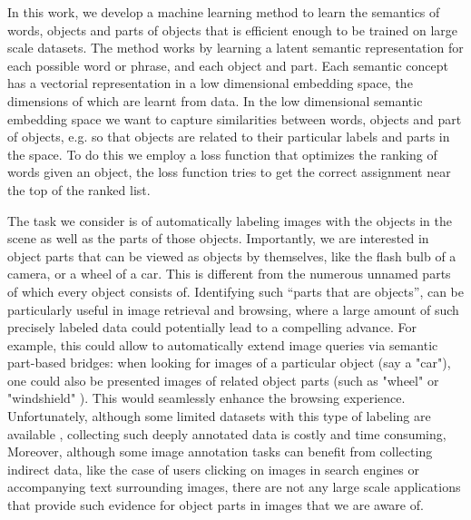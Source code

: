 In this work, we develop a machine learning method to learn the
semantics of words, objects and parts of objects that is efficient
enough to be trained on large scale datasets.  The method works by
learning a latent semantic representation for each possible word or
phrase, and each object and part. Each semantic concept has a
vectorial representation in a low dimensional embedding space, the
dimensions of which are learnt from data.
In the low dimensional semantic embedding space we want to capture
similarities between words, objects and part of objects, e.g. so that
objects are related to their particular labels and parts in the space.
To do this we employ a loss function that optimizes the ranking of
words given an object, the loss function tries to get the correct
assignment near the top of the ranked list.

The task we consider is of automatically labeling images with the
objects in the scene as well as the parts of those objects.
Importantly, we are interested in object parts that can be viewed as
objects by themselves, like the flash bulb of a camera, or a wheel of a car.
This is different from the numerous unnamed parts of which every object
consists of. Identifying such ``parts that are objects'', can be
particularly useful in image retrieval and browsing, where a large amount of 
such precisely labeled data could potentially lead
to a compelling advance.
%
%
%
%
%
%
For example, this could allow to automatically extend image queries 
via semantic part-based bridges: when looking for images of a particular 
object (say a "car"), one could also be presented images of related object parts 
(such as "wheel" or "windshield" ). This would seamlessly enhance the browsing experience.
%
Unfortunately, although some limited datasets with this type of
labeling are available \citep{Yao:2007, labelme}, collecting such
deeply annotated data is costly and time consuming,
%
Moreover, although some image annotation tasks can benefit from
collecting indirect data, like the case of users clicking on images in
search engines or accompanying text surrounding images, there are not
any large scale applications that provide such evidence for object
parts in images that we are aware of.


